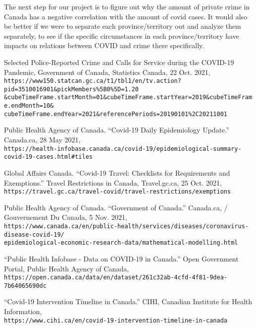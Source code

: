 \documentclass[fontsize=11pt]{article}
\newcommand{\quotes}[1]{``#1''}
\begin{document}
The next step for our project is to figure out why the amount of private crime in Canada has a negative correlation with the amount of covid cases. It would also be better if we were to separate each province/territory out and analyze them separately, to see if the specific circumstances in each province/territory have impacts on relations between COVID and crime there specifically. 

\begin{thebibliography}{9}
	Selected Police-Reported Crime and Calls for Service during the COVID-19 Pandemic, Government of Canada, Statistics Canada, 22 Oct. 2021, \\
	\verb+https://www150.statcan.gc.ca/t1/tbl1/en/tv.action?pid=3510016901&pickMembers%5B0%5D=1.20+\\
	\verb+&cubeTimeFrame.startMonth=01&cubeTimeFrame.startYear=2019&cubeTimeFrame.endMonth=10&+\\
	\verb+cubeTimeFrame.endYear=2021&referencePeriods=20190101%2C20211001+

	Public Health Agency of Canada. \quotes{Covid-19 Daily Epidemiology Update.} Canada.ca, 28 May 2021,\\
	\verb+https://health-infobase.canada.ca/covid-19/epidemiological-summary-covid-19-cases.html#tiles+

	Global Affairs Canada. \quotes{Covid-19 Travel: Checklists for Requirements and Exemptions.} Travel Restrictions in Canada,  Travel.gc.ca, 25 Oct. 2021,\\
	\verb+https://travel.gc.ca/travel-covid/travel-restrictions/exemptions+

	Public Health Agency of Canada. \quotes{Government of Canada.} Canada.ca, / Gouvernement Du Canada, 5 Nov. 2021,\\
	\verb+https://www.canada.ca/en/public-health/services/diseases/coronavirus-disease-covid-19/+\\
	\verb+epidemiological-economic-research-data/mathematical-modelling.html+

	\quotes{Public Health Infobase - Data on COVID-19 in Canada.} Open Government Portal, Public Health Agency of Canada,\\
	\verb+https://open.canada.ca/data/en/dataset/261c32ab-4cfd-4f81-9dea-7b64065690dc+

	\quotes{Covid-19 Intervention Timeline in Canada.} CIHI, Canadian Institute for Health Information,\\
	\verb+https://www.cihi.ca/en/covid-19-intervention-timeline-in-canada+



\end{thebibliography}
\end{document}
